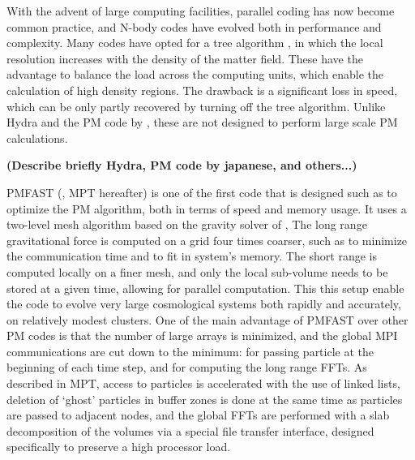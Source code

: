 With the advent of large computing facilities, parallel coding has now become common practice, 
and N-body codes have evolved both in performance and complexity. 
Many codes have opted for a tree algorithm \citep{Gadjet, Gadjet2, TPM, GOTPM}, in which 
the local resolution increases with the density of the matter field. 
These have the advantage to balance the load across the computing units, which enable the calculation of high density regions. 
The drawback is a significant loss in speed, which can be only partly recovered by turning off the tree algorithm. 
Unlike Hydra \citep{couchman1991} and the PM code by \cite{FerrelBertschinger1995},
 these are not designed to perform large scale PM calculations. 

{\bf (Describe briefly   Hydra, PM code by japanese, and others...)}


{\small PMFAST} (\cite{PMFAST}, MPT hereafter) is one of the first code that is designed such as to optimize the PM algorithm,
both in terms of speed and memory usage. It uses a two-level mesh algorithm based on the gravity solver of \cite{TracPen2003},
The long range gravitational force is computed on a  grid four times coarser, such as to minimize the communication time
and to fit in system's memory. The short range is computed locally on a finer mesh, and only the local sub-volume needs 
to be stored at a given time, allowing for parallel computation.
This this setup enable the code to evolve very large cosmological systems both rapidly and accurately, on relatively modest clusters.
One of the main advantage of {\small PMFAST} over other PM codes is that the number of large arrays is minimized,
and the global {\small MPI} communications are cut down to the minimum: for passing particle at the beginning of each time step,
and  for computing the long range FFTs.
As described in MPT, access to particles is accelerated with the use of linked lists, deletion of `ghost' particles
in buffer zones is done at the same time as particles are passed to adjacent nodes,
and the global FFTs are performed with a slab decomposition of the volumes via a special file transfer interface, 
designed specifically to preserve a high processor load.

